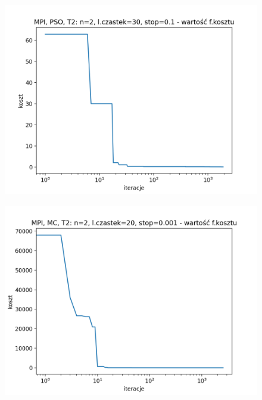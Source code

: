 \documentclass[11pt, a4paper, oneside]{article}
\begin{document}
\begin{figure}[H]
\centering
\begin{minipage}[b]{\dimexpr.5\textwidth-1em}
  \centering
  \includegraphics[width=1\linewidth]{grafiki2/MPI_PSO_T2/MPI_PSO_T2_koszt_monotoniczny.png}
  \label{fig:koszt:PSO2}
\end{minipage} \hfill
\begin{minipage}[b]{\dimexpr.5\textwidth-1em}
  \centering
  \includegraphics[width=1\linewidth]{grafiki2/MPI_MC_T2/MPI_MC_T2_koszt.png}
  \label{fig:koszt:MC2}
\end{minipage}
\end{figure}
\end{document}
